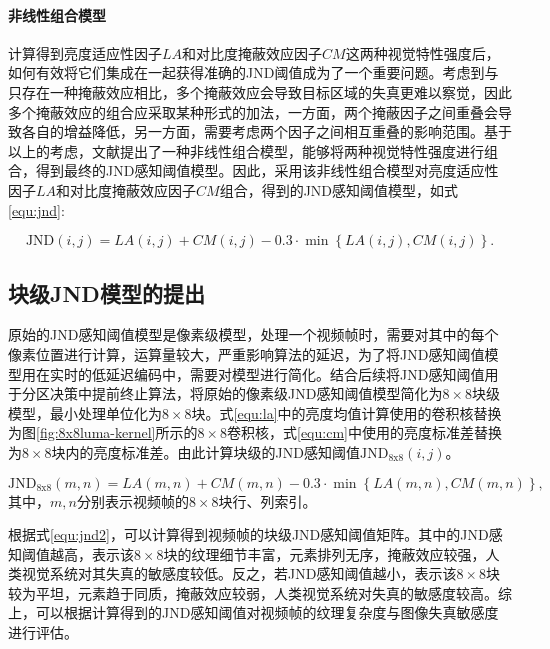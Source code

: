   \paragraph{非线性组合模型} 计算得到亮度适应性因子$LA$和对比度掩蔽效应因子$CM$这两种视觉特性强度后，如何有效将它们集成在一起获得准确的JND阈值成为了一个重要问题。考虑到与只存在一种掩蔽效应相比，多个掩蔽效应会导致目标区域的失真更难以察觉，因此多个掩蔽效应的组合应采取某种形式的加法，一方面，两个掩蔽因子之间重叠会导致各自的增益降低，另一方面，需要考虑两个因子之间相互重叠的影响范围。基于以上的考虑，文献\cite{yangJustNoticeableDistortion2005}提出了一种非线性组合模型，能够将两种视觉特性强度进行组合，得到最终的JND感知阈值模型。因此，采用该非线性组合模型对亮度适应性因子$LA$和对比度掩蔽效应因子$CM$组合，得到的JND感知阈值模型，如式\ref{equ:jnd}:

  \begin{equation} \label{equ:jnd}
    \mathrm{JND}(i, j) = LA(i, j) + CM(i, j) - 0.3 \cdot \min \left\{LA(i, j) , CM(i, j)\right\}.
  \end{equation}



	\subsection{块级JND模型的提出\label{sec:blk-based-jnd}}
	原始的JND感知阈值模型是像素级模型，处理一个视频帧时，需要对其中的每个像素位置进行计算，运算量较大，严重影响算法的延迟，为了将JND感知阈值模型用在实时的低延迟编码中，需要对模型进行简化。结合后续将JND感知阈值用于分区决策中提前终止算法，将原始的像素级JND感知阈值模型简化为$8\times 8$块级模型，最小处理单位化为$8\times 8$块。式\ref{equ:la}中的亮度均值计算使用的卷积核替换为图\ref{fig:8x8luma-kernel}所示的$8\times 8$卷积核，式\ref{equ:cm}中使用的亮度标准差替换为$8\times 8$块内的亮度标准差。由此计算块级的JND感知阈值$\mathrm{JND_{8x8}}(i, j)$。

	\begin{equation} \label{equ:jnd2}
		\mathrm{JND_{8x8}}(m, n) = LA(m, n) + CM(m, n) - 0.3 \cdot \min \left\{LA(m, n) , CM(m, n)\right\},
	\end{equation}
	其中，$m, n$分别表示视频帧的$8\times 8$块行、列索引。

  根据式\ref{equ:jnd2}，可以计算得到视频帧的块级JND感知阈值矩阵。其中的JND感知阈值越高，表示该$8\times 8$块的纹理细节丰富，元素排列无序，掩蔽效应较强，人类视觉系统对其失真的敏感度较低。反之，若JND感知阈值越小，表示该$8\times 8$块较为平坦，元素趋于同质，掩蔽效应较弱，人类视觉系统对失真的敏感度较高。综上，可以根据计算得到的JND感知阈值对视频帧的纹理复杂度与图像失真敏感度进行评估。

